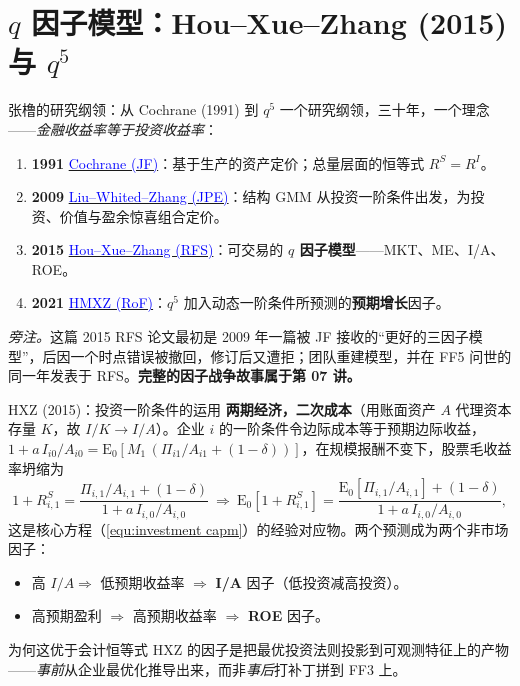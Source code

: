 \documentclass{beamer}
\begin{document}
\section{$q$ 因子模型：Hou--Xue--Zhang (2015) 与 $q^5$}

\begin{frame}{张橹的研究纲领：从 Cochrane (1991) 到 $q^5$}
	\small
	一个研究纲领，三十年，一个理念——\textit{金融收益率等于投资收益率}：
	\begin{enumerate}
		\item \textbf{1991} \quad \href{https://doi.org/10.1111/j.1540-6261.1991.tb03750.x}{\textcolor{blue}{Cochrane (JF)}}：基于生产的资产定价；总量层面的恒等式 $R^S=R^I$。
		\item \textbf{2009} \quad \href{https://doi.org/10.1086/649760}{\textcolor{blue}{Liu--Whited--Zhang (JPE)}}：结构 GMM 从投资一阶条件出发，为投资、价值与盈余惊喜组合定价。
		\item \textbf{2015} \quad \href{https://doi.org/10.1093/rfs/hhu068}{\textcolor{blue}{Hou--Xue--Zhang (RFS)}}：可交易的 \textbf{$q$ 因子模型}——MKT、ME、I/A、ROE。
		\item \textbf{2021} \quad \href{https://doi.org/10.1093/rof/rfaa004}{\textcolor{blue}{HMXZ (RoF)}}：$q^5$ 加入动态一阶条件所预测的\textbf{预期增长}因子。
	\end{enumerate}
	\vspace{2pt}
	{\footnotesize\textit{旁注。}这篇 2015 RFS 论文最初是 2009 年一篇被 JF 接收的“更好的三因子模型”，后因一个时点错误被撤回，修订后又遭拒；团队重建模型，并在 FF5 问世的同一年发表于 RFS。\textbf{完整的因子战争故事属于第 07 讲。}}
\end{frame}

\begin{frame}{HXZ (2015)：投资一阶条件的运用}
	\textbf{两期经济，二次成本}（用账面资产 $A$ 代理资本存量 $K$，故 $I/K\to I/A$）。企业 $i$ 的一阶条件令边际成本等于预期边际收益，$1+a\,I_{i0}/A_{i0}=\mathrm{E}_0[M_1\,(\Pi_{i1}/A_{i1}+(1-\delta))]$，在规模报酬不变下，股票毛收益率坍缩为
	\[
		1+R^S_{i,1}=\frac{\Pi_{i,1}/A_{i,1}+(1-\delta)}{1+a\,I_{i,0}/A_{i,0}}\ \Longrightarrow\ \mathrm{E}_0[1+R^S_{i,1}]=\frac{\mathrm{E}_0[\Pi_{i,1}/A_{i,1}]+(1-\delta)}{1+a\,I_{i,0}/A_{i,0}},
	\]
	这是核心方程（\ref{equ:investment capm}）的经验对应物。两个预测成为两个非市场因子：
	\begin{itemize}
		\item 高 $I/A \Rightarrow$ 低预期收益率 $\Rightarrow$ \textbf{I/A} 因子（低投资减高投资）。
		\item 高预期盈利 $\Rightarrow$ 高预期收益率 $\Rightarrow$ \textbf{ROE} 因子。
	\end{itemize}
	\begin{block}{为何这优于会计恒等式}
		HXZ 的因子是把最优投资法则投影到可观测特征上的产物——\textit{事前}从企业最优化推导出来，而非\textit{事后}打补丁拼到 FF3 上。
	\end{block}
\end{frame}
\end{document}
